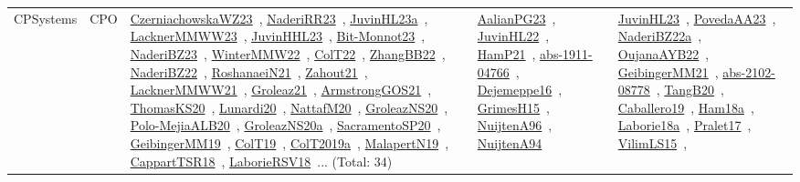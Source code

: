 {\begin{longtable}{lp{3cm}>{\raggedright\arraybackslash}p{6cm}>{\raggedright\arraybackslash}p{6cm}>{\raggedright\arraybackslash}p{8cm}}
CPSystems & CPO & \href{../works/CzerniachowskaWZ23.pdf}{CzerniachowskaWZ23}~\cite{CzerniachowskaWZ23}, \href{../works/NaderiRR23.pdf}{NaderiRR23}~\cite{NaderiRR23}, \href{../works/JuvinHL23a.pdf}{JuvinHL23a}~\cite{JuvinHL23a}, \href{../works/LacknerMMWW23.pdf}{LacknerMMWW23}~\cite{LacknerMMWW23}, \href{../works/JuvinHHL23.pdf}{JuvinHHL23}~\cite{JuvinHHL23}, \href{../works/Bit-Monnot23.pdf}{Bit-Monnot23}~\cite{Bit-Monnot23}, \href{../works/NaderiBZ23.pdf}{NaderiBZ23}~\cite{NaderiBZ23}, \href{../works/WinterMMW22.pdf}{WinterMMW22}~\cite{WinterMMW22}, \href{../works/ColT22.pdf}{ColT22}~\cite{ColT22}, \href{../works/ZhangBB22.pdf}{ZhangBB22}~\cite{ZhangBB22}, \href{../works/NaderiBZ22.pdf}{NaderiBZ22}~\cite{NaderiBZ22}, \href{../works/RoshanaeiN21.pdf}{RoshanaeiN21}~\cite{RoshanaeiN21}, \href{../works/Zahout21.pdf}{Zahout21}~\cite{Zahout21}, \href{../works/LacknerMMWW21.pdf}{LacknerMMWW21}~\cite{LacknerMMWW21}, \href{../works/Groleaz21.pdf}{Groleaz21}~\cite{Groleaz21}, \href{../works/ArmstrongGOS21.pdf}{ArmstrongGOS21}~\cite{ArmstrongGOS21}, \href{../works/ThomasKS20.pdf}{ThomasKS20}~\cite{ThomasKS20}, \href{../works/Lunardi20.pdf}{Lunardi20}~\cite{Lunardi20}, \href{../works/NattafM20.pdf}{NattafM20}~\cite{NattafM20}, \href{../works/GroleazNS20.pdf}{GroleazNS20}~\cite{GroleazNS20}, \href{../works/Polo-MejiaALB20.pdf}{Polo-MejiaALB20}~\cite{Polo-MejiaALB20}, \href{../works/GroleazNS20a.pdf}{GroleazNS20a}~\cite{GroleazNS20a}, \href{../works/SacramentoSP20.pdf}{SacramentoSP20}~\cite{SacramentoSP20}, \href{../works/GeibingerMM19.pdf}{GeibingerMM19}~\cite{GeibingerMM19}, \href{../works/ColT19.pdf}{ColT19}~\cite{ColT19}, \href{../works/ColT2019a.pdf}{ColT2019a}~\cite{ColT2019a}, \href{../works/MalapertN19.pdf}{MalapertN19}~\cite{MalapertN19}, \href{../works/CappartTSR18.pdf}{CappartTSR18}~\cite{CappartTSR18}, \href{../works/LaborieRSV18.pdf}{LaborieRSV18}~\cite{LaborieRSV18}... (Total: 34) & \href{../works/AalianPG23.pdf}{AalianPG23}~\cite{AalianPG23}, \href{../works/JuvinHL22.pdf}{JuvinHL22}~\cite{JuvinHL22}, \href{../works/HamP21.pdf}{HamP21}~\cite{HamP21}, \href{../works/abs-1911-04766.pdf}{abs-1911-04766}~\cite{abs-1911-04766}, \href{../works/Dejemeppe16.pdf}{Dejemeppe16}~\cite{Dejemeppe16}, \href{../works/GrimesH15.pdf}{GrimesH15}~\cite{GrimesH15}, \href{../works/NuijtenA96.pdf}{NuijtenA96}~\cite{NuijtenA96}, \href{../works/NuijtenA94.pdf}{NuijtenA94}~\cite{NuijtenA94} & \href{../works/JuvinHL23.pdf}{JuvinHL23}~\cite{JuvinHL23}, \href{../works/PovedaAA23.pdf}{PovedaAA23}~\cite{PovedaAA23}, \href{../works/NaderiBZ22a.pdf}{NaderiBZ22a}~\cite{NaderiBZ22a}, \href{../works/OujanaAYB22.pdf}{OujanaAYB22}~\cite{OujanaAYB22}, \href{../works/GeibingerMM21.pdf}{GeibingerMM21}~\cite{GeibingerMM21}, \href{../works/abs-2102-08778.pdf}{abs-2102-08778}~\cite{abs-2102-08778}, \href{../works/TangB20.pdf}{TangB20}~\cite{TangB20}, \href{../works/Caballero19.pdf}{Caballero19}~\cite{Caballero19}, \href{../works/Ham18a.pdf}{Ham18a}~\cite{Ham18a}, \href{../works/Laborie18a.pdf}{Laborie18a}~\cite{Laborie18a}, \href{../works/Pralet17.pdf}{Pralet17}~\cite{Pralet17}, \href{../works/VilimLS15.pdf}{VilimLS15}~\cite{VilimLS15}, 
\end{longtable}}
